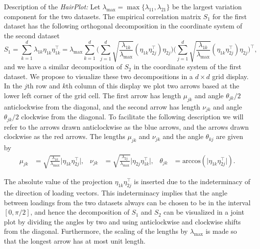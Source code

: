 \documentclass[titlepage,11pt,twoside]{article}
\newcommand{\acos}{\text{arccos}}
\begin{document}
\medskip

Description of the \emph{HairPlot:} Let $\lambda_{\max} = \max\{ \lambda_{11}, \lambda_{21} \}$ be the largest variation component for the two datasets. The empirical correlation matrix $S_1$ for the first dataset has the following orthogonal decomposition in the coordinate system of the second dataset
\begin{equation*}
S_1 = \sum_{k=1}^d \lambda_{1k} \eta_{1k} \eta_{1k}^\top
= \lambda_{\max} \sum_{k=1}^d
\Bigg( \sum_{j=1}^d \sqrt{\frac{\lambda_{1k}}{\lambda_{\max}}} (\eta_{1k} \eta_{2j}^\top) \eta_{2j} \Bigg)
\Bigg( \sum_{j=1}^d \sqrt{\frac{\lambda_{1k}}{\lambda_{\max}}} (\eta_{1k} \eta_{2j}^\top) \eta_{2j} \Bigg)^\top,
\end{equation*}
and we have a similar decomposition of $S_2$ in the coordinate system of the first dataset. We propose to visualize these two decompositions in a $d \times d$ grid display. In the $j$th row and $k$th column of this display we plot two arrows based at the lower left corner of the grid cell. The first arrow has length $\mu_{jk}$ and angle $\theta_{jk}/2$ anticlockwise from the diagonal, and the second arrow has length $\nu_{jk}$ and angle $\theta_{jk}/2$ clockwise from the diagonal. To facilitate the following description we will refer to the arrows drawn anticlockwise as the blue arrows, and the arrows drawn clockwise as the red arrows. The lengths $\mu_{jk}$ and $\nu_{jk}$ and the angle $\theta_{kj}$ are given by
\begin{align*}
\mu_{jk} &= \sqrt{\frac{\lambda_{1k}}{\lambda_{\max}}} \lvert \eta_{1k} \eta_{2j}^\top \rvert, &
\nu_{jk} &= \sqrt{\frac{\lambda_{2j}}{\lambda_{\max}}} \lvert \eta_{2j} \eta_{1k}^\top \rvert, &
\theta_{jk} &= \acos(\lvert \eta_{1k} \eta_{2j}^\top \rvert).
\end{align*}

The absolute value of the projection $\eta_{1k} \eta_{2j}^\top$ is inserted due to the indeterminacy of the direction of loading vectors. This indeterminacy implies that the angle between loadings from the two datasets always can be chosen to be in the interval $[0,\pi/2]$, and hence the decomposition of $S_1$ and $S_2$ can be visualized in a joint plot by dividing the angles by two and using anticlockwise and clockwise shifts from the diagonal. Furthermore, the scaling of the lengths by $\lambda_{\max}$ is made so that the longest arrow has at most unit length.
\end{document}
